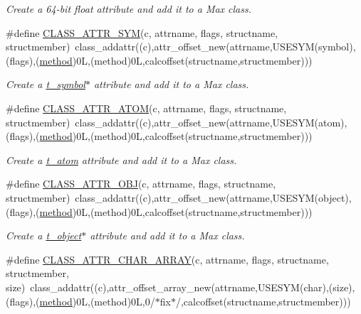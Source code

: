\begin{DoxyCompactItemize}
\begin{DoxyCompactList}\small\item\em Create a 64-\/bit float attribute and add it to a Max class. \item\end{DoxyCompactList}\item 
\#define \hyperlink{group__attr_gaef468ae67347721c1fd8bc7b54c89845}{CLASS\_\-ATTR\_\-SYM}(c, attrname, flags, structname, structmember)~class\_\-addattr((c),attr\_\-offset\_\-new(attrname,USESYM(symbol),(flags),(\hyperlink{group__datatypes_gac26ba0a173b50597f5738132e059b42d}{method})0L,(method)0L,calcoffset(structname,structmember)))
\begin{DoxyCompactList}\small\item\em Create a \hyperlink{structt__symbol}{t\_\-symbol}$\ast$ attribute and add it to a Max class. \item\end{DoxyCompactList}\item 
\#define \hyperlink{group__attr_gabc5c0dc2b547fed7406250b08aaf3904}{CLASS\_\-ATTR\_\-ATOM}(c, attrname, flags, structname, structmember)~class\_\-addattr((c),attr\_\-offset\_\-new(attrname,USESYM(atom),(flags),(\hyperlink{group__datatypes_gac26ba0a173b50597f5738132e059b42d}{method})0L,(method)0L,calcoffset(structname,structmember)))
\begin{DoxyCompactList}\small\item\em Create a \hyperlink{structt__atom}{t\_\-atom} attribute and add it to a Max class. \item\end{DoxyCompactList}\item 
\#define \hyperlink{group__attr_gae5165b6a5bba9ad1b351263705f6059d}{CLASS\_\-ATTR\_\-OBJ}(c, attrname, flags, structname, structmember)~class\_\-addattr((c),attr\_\-offset\_\-new(attrname,USESYM(object),(flags),(\hyperlink{group__datatypes_gac26ba0a173b50597f5738132e059b42d}{method})0L,(method)0L,calcoffset(structname,structmember)))
\begin{DoxyCompactList}\small\item\em Create a \hyperlink{structt__object}{t\_\-object}$\ast$ attribute and add it to a Max class. \item\end{DoxyCompactList}\item 
\#define \hyperlink{group__attr_ga993e3c3fa7470fcc90b0603e56a3010c}{CLASS\_\-ATTR\_\-CHAR\_\-ARRAY}(c, attrname, flags, structname, structmember, size)~class\_\-addattr((c),attr\_\-offset\_\-array\_\-new(attrname,USESYM(char),(size),(flags),(\hyperlink{group__datatypes_gac26ba0a173b50597f5738132e059b42d}{method})0L,(method)0L,0/$\ast$fix$\ast$/,calcoffset(structname,structmember)))

\end{DoxyCompactItemize}
